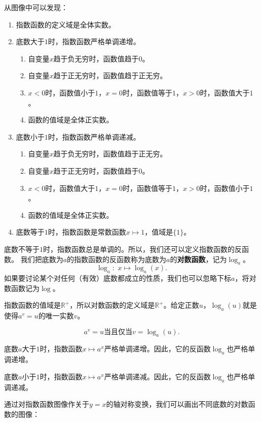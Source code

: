 \documentclass[12pt,UTF8]{ctexbook}
\begin{document}
从图像中可以发现：
\begin{enumerate}
    \item 指数函数的定义域是全体实数。
    \item 底数大于$1$时，指数函数严格单调递增。
    \begin{enumerate}[label*=\arabic*.]
        \item 自变量$x$趋于负无穷时，函数值趋于$0$。
        \item 自变量$x$趋于正无穷时，函数值趋于正无穷。
        \item $x < 0$时，函数值小于$1$，$x = 0$时，函数值等于$1$，$x > 0$时，函数值大于$1$。
        \item 函数的值域是全体正实数。
    \end{enumerate}
    \item 底数小于$1$时，指数函数严格单调递减。    
    \begin{enumerate}[label*=\arabic*.]
        \item 自变量$x$趋于负无穷时，函数值趋于正无穷。
        \item 自变量$x$趋于正无穷时，函数值趋于$0$。
        \item $x < 0$时，函数值大于$1$，$x = 0$时，函数值等于$1$，$x > 0$时，函数值小于$1$。
        \item 函数的值域是全体正实数。
    \end{enumerate}
    \item 底数等于$1$时，指数函数是常数函数$x \mapsto 1$，值域是$\{1\}$。
\end{enumerate}

底数不等于$1$时，指数函数总是单调的。所以，我们还可以定义指数函数的反函数。
我们把底数为$a$的指数函数的反函数称为底数为$a$的\textbf{对数函数}，记为$\log_a$。
$$ \log_a : \,\, x \mapsto \log_a(x). $$
如果要讨论某个对任何（有效）底数都成立的性质，我们也可以忽略下标$a$，将对数函数记为$\log$。

指数函数的值域是$\mathbb{R}^+$，所以对数函数的定义域是$\mathbb{R}^+$。给定正数$u$，$\log_a(u)$就是使得$a^v = u$的唯一实数$v$。

$$ a^v = u \mbox{当且仅当} v = \log_a(u). $$

底数$a$大于$1$时，指数函数$x\mapsto a^x$严格单调递增。因此，它的反函数$\log_a$也严格单调递增。

底数$a$小于$1$时，指数函数$x\mapsto a^x$严格单调递减。因此，它的反函数$\log_a$也严格单调递减。

通过对指数函数图像作关于$y = x$的轴对称变换，我们可以画出不同底数的对数函数的图像：
\end{document}
